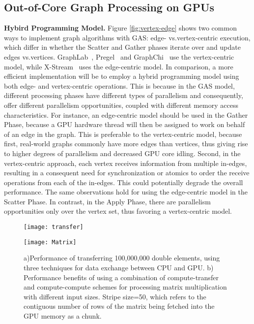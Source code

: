 \subsection{Out-of-Core Graph Processing on GPUs}
\textbf{Hybird Programming Model.}
Figure \ref{fig:vertex-edge} shows two common ways to implement graph algorithms with GAS: edge- vs.vertex-centric execution, which differ in whether the
Scatter and Gather phases iterate over and update edges vs.vertices. GraphLab~\cite{graphlab}, Pregel~\cite{pregel} and GraphChi~\cite{chi} use the vertex-centric model, while X-Stream~\cite{xstream} uses the edge-centric model. In comparison, a more efficient implementation will be to employ a hybrid programming model using both edge- and vertex-centric operations. This is because in the GAS model, different processing phases have different types of parallelism and consequently, offer different parallelism opportunities, coupled with different memory access characteristics. For instance, an edge-centric model should be used in the Gather Phase, because a GPU hardware thread will then be assigned to work on behalf of an edge in the graph. This is preferable to the vertex-centric model, because first, real-world graphs commonly have more edges than vertices, thus giving rise to higher degrees of parallelism and decreased GPU core idling. Second, in the vertex-centric approach, each vertex receives information from multiple in-edges, resulting in a consequent need for synchronization or atomics to order the receive operations from each of the in-edges. This could potentially degrade the overall performance. The same observations hold for using the edge-centric model in the Scatter Phase. In contrast, in the Apply Phase, there are parallelism opportunities only over the vertex set, thus favoring a vertex-centric model.

\label{fig:prob}
\begin{center}
\begin{figure*}[t]
\begin{center}
\begin{minipage}{0.49\textwidth}
\texttt{[image: transfer]}
\end{minipage}
\begin{minipage}{0.49\textwidth}
\texttt{[image: Matrix]}
\end{minipage}
\caption{\small a)Performance of transferring 100,000,000 double elements, using three techniques for data exchange between CPU and GPU. b) Performance benefits of using a combination of compute-transfer and compute-compute schemes for processing matrix multiplication with different input sizes. Stripe size=50, which refers to the contiguous number of rows of the matrix being fetched into the GPU memory as a chunk.}
\label{fig:transfer}
\end{center}	
\end{figure*}
\end{center}

